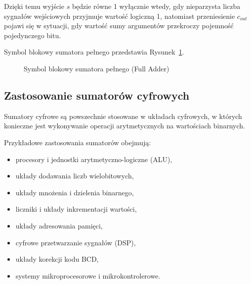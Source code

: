 Dzięki temu wyjście $s$ będzie równe 1 wyłącznie wtedy, gdy nieparzysta liczba sygnałów wejściowych przyjmuje wartość logiczną 1, natomiast przeniesienie $c_{out}$ pojawi się w sytuacji, gdy wartość sumy argumentów przekroczy pojemność pojedynczego bitu.

Symbol blokowy sumatora pełnego przedstawia Rysunek~\ref{fig:symbol-fa}.

\begin{figure}[h]
    \centering
    \caption{Symbol blokowy sumatora pełnego (Full Adder)}
    \label{fig:symbol-fa}
\end{figure}

\subsection{Zastosowanie sumatorów cyfrowych}

Sumatory cyfrowe są powszechnie stosowane w układach cyfrowych, w których konieczne jest wykonywanie operacji arytmetycznych na wartościach binarnych.

Przykładowe zastosowania sumatorów obejmują:
\begin{itemize}
    \item procesory i jednostki arytmetyczno-logiczne (ALU),
    \item układy dodawania liczb wielobitowych,
    \item układy mnożenia i dzielenia binarnego,
    \item liczniki i układy inkrementacji wartości,
    \item układy adresowania pamięci,
    \item cyfrowe przetwarzanie sygnałów (DSP),
    \item układy korekcji kodu BCD,
    \item systemy mikroprocesorowe i mikrokontrolerowe.
\end{itemize}

